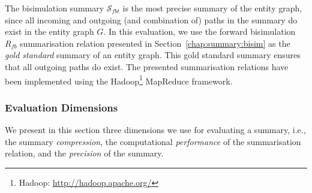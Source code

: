 The bisimulation summary $\mathcal{S}_{fbt}$ is the most precise summary of the entity graph, since all incoming and outgoing (and combination of) paths in the summary do exist in the entity graph $G$. In this evaluation, we use the forward bisimulation $R_{fb}$ summarisation relation presented in Section~\ref{chap:summary:bisim} as the \emph{gold standard} summary of an entity graph. This gold standard summary ensures that all outgoing paths do exist. The presented summarisation relations have been implemented using the Hadoop\footnote{Hadoop: \url{http://hadoop.apache.org/}} MapReduce framework.

\subsubsection{Evaluation Dimensions}

We present in this section three dimensions we use for evaluating a summary, i.e., the summary \emph{compression}, the computational \emph{performance} of the summarisation relation, and the \emph{precision} of the summary.

